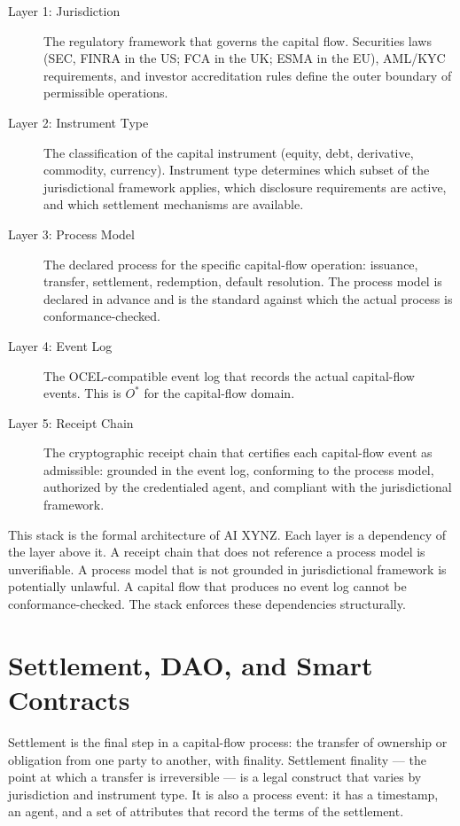 \begin{description}
  \item[Layer 1: Jurisdiction] The regulatory framework that governs the capital flow. Securities laws (SEC, FINRA in the US; FCA in the UK; ESMA in the EU), AML/KYC requirements, and investor accreditation rules define the outer boundary of permissible operations.
  \item[Layer 2: Instrument Type] The classification of the capital instrument (equity, debt, derivative, commodity, currency). Instrument type determines which subset of the jurisdictional framework applies, which disclosure requirements are active, and which settlement mechanisms are available.
  \item[Layer 3: Process Model] The declared process for the specific capital-flow operation: issuance, transfer, settlement, redemption, default resolution. The process model is declared in advance and is the standard against which the actual process is conformance-checked.
  \item[Layer 4: Event Log] The OCEL-compatible event log that records the actual capital-flow events. This is $O^{*}$ for the capital-flow domain.
  \item[Layer 5: Receipt Chain] The cryptographic receipt chain that certifies each capital-flow event as admissible: grounded in the event log, conforming to the process model, authorized by the credentialed agent, and compliant with the jurisdictional framework.
\end{description}

This stack is the formal architecture of AI XYNZ. Each layer is a dependency of the layer above it. A receipt chain that does not reference a process model is unverifiable. A process model that is not grounded in jurisdictional framework is potentially unlawful. A capital flow that produces no event log cannot be conformance-checked. The stack enforces these dependencies structurally.

\section{Settlement, DAO, and Smart Contracts}

Settlement is the final step in a capital-flow process: the transfer of ownership or obligation from one party to another, with finality. Settlement finality --- the point at which a transfer is irreversible --- is a legal construct that varies by jurisdiction and instrument type. It is also a process event: it has a timestamp, an agent, and a set of attributes that record the terms of the settlement.

